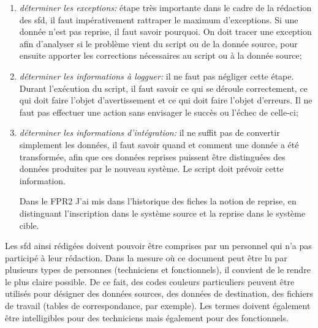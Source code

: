 \documentclass{book}
\begin{document}
\begin{enumerate}
\begin{itemize}
   \begin{bclogo}[arrondi = 0.1, couleur = blue!10, logo = \bcinfo]{Dans le FPR2}
Par exemple, il manquait pour certaines fiches liées aux permis de conduire le type d'arrêté qui les concernait, cette donnée étant obligatoire dans le FPR2. Les fiches ont donc été reprises sans cette donnée, et si un opérateur souhaite modifier dans l'\gls{ihm} dédiée du FPR2 une fiche impactée, il devra faire en sorte qu'elle obéisse aux contraintes du nouveau système.
   \end{bclogo}
  \end{itemize}
  \item \textit{déterminer les exceptions:} étape très importante dans le cadre de la rédaction des \gls{sfd}, il faut impérativement rattraper le maximum d'exceptions. Si une donnée n'est pas reprise, il faut savoir pourquoi. On doit tracer une exception afin d'analyser si le problème vient du script ou de la donnée source, pour ensuite apporter les corrections nécessaires au script ou à la donnée source;
  \item \textit{déterminer les informations à logguer:} il ne faut pas négliger cette étape. Durant l'exécution du script, il faut savoir ce qui se déroule correctement, ce qui doit faire l'objet d'avertissement et ce qui doit faire l'objet d'erreurs. Il ne faut pas effectuer une action sans envisager le succès ou l'échec de celle-ci;
  \item \textit{déterminer les informations d'intégration:} il ne suffit pas de convertir simplement les données, il faut savoir quand et comment une donnée a été transformée, afin que ces données reprises puissent être distinguées des données produites par le nouveau système. Le script doit prévoir cette information.
  \begin{bclogo}[arrondi = 0.1, couleur = blue!10, logo = \bcinfo]{Dans le FPR2}
J'ai mis dans l'historique des fiches la notion de reprise, en distinguant l'inscription dans le système source et la reprise dans le système cible.
  \end{bclogo}
\end{enumerate}
  
Les \gls{sfd} ainsi rédigées doivent pouvoir être comprises par un personnel qui n'a pas participé à leur rédaction. Dans la mesure où ce document peut être lu par plusieurs types de personnes (techniciens et fonctionnels), il convient de le rendre le plus claire possible. De ce fait, des codes couleurs particuliers peuvent être utilisés pour désigner des données sources, des données de destination, des fichiers de travail (tables de correspondance, par exemple). Les termes doivent également être intelligibles pour des techniciens mais également pour des fonctionnels.
\end{document}
